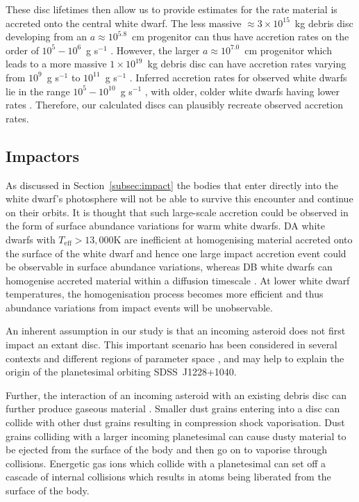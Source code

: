 \documentclass[fleqn,usenatbib]{mnras}
\newcommand{\gs}{g s$^{-1}$ } %
\begin{document}
These disc lifetimes then allow us to provide estimates for the rate material is accreted onto the central white dwarf. 
The less massive $\approx 3\times 10^{15}$~kg debris disc developing from an $a \approx 10^{5.8}$~cm progenitor can thus have accretion rates on the order of $10^5-10^6$~\gs.
However, the larger $a \approx 10^{7.0}$~cm progenitor which leads to a more massive $1\times10^{19}$~kg debris disc can have accretion rates varying from $10^9$~\gs to $10^{11}$~\gs.
Inferred accretion rates for observed white dwarfs lie in the range $10^5 - 10^{10}$~\gs, with older, colder white dwarfs having lower rates \citep[e.g.][]{Wyatt2014, Koester2014, Farihi2016}.
Therefore, our calculated discs can plausibly recreate observed accretion rates.


\subsection{Impactors} \label{subsec:impacted}
As discussed in Section~\ref{subsec:impact} the bodies that enter directly into the white dwarf's photosphere will not be able to survive this encounter and continue on their orbits. 
It is thought that such large-scale accretion could be observed in the form of surface abundance variations for warm white dwarfs. 
DA white dwarfs with $T_\text{eff} > 13,000$K are inefficient at homogenising material accreted onto the surface of the white dwarf and hence one large impact accretion event could be observable in surface abundance variations, whereas DB white dwarfs can homogenise accreted material within a diffusion timescale \citep{Cunningham2021}.
At lower white dwarf temperatures, the homogenisation process becomes more efficient and thus abundance variations from impact events will be unobservable. 

An inherent assumption in our study is that an incoming asteroid does not first impact an extant disc. This important scenario has been considered in several contexts and different regions of parameter space \citep{Grishin2019, OConnor2020, Malamud2021}, and may help to explain the origin of the planetesimal orbiting SDSS~J1228+1040.

Further, the interaction of an incoming asteroid with an existing debris disc can further produce gaseous material \citep{Malamud2021}.
Smaller dust grains entering into a disc can collide with other dust grains resulting in compression shock vaporisation. 
Dust grains colliding with a larger incoming planetesimal can cause dusty material to be ejected from the surface of the body and then go on to vaporise through collisions. 
Energetic gas ions which collide with a planetesimal can set off a cascade of internal collisions which results in atoms being liberated from the surface of the body. 
\end{document}
